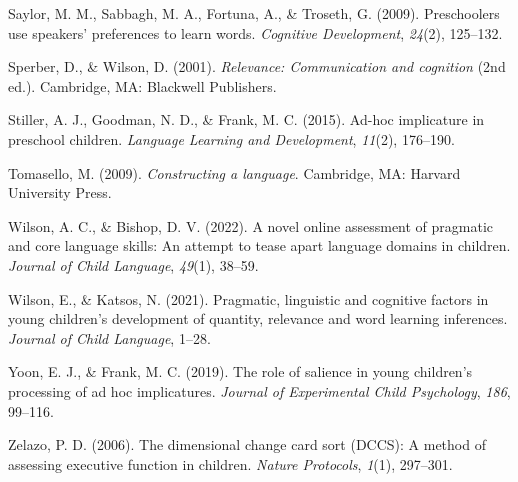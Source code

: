 \documentclass[
  man,floatsintext]{apa6}
\newlength{\cslhangindent}
\newlength{\cslentryspacingunit} %
\newenvironment{CSLReferences}[2] %
 {%
  \setlength{\parindent}{0pt}
  \ifodd #1
  \let\oldpar\par
  \def\par{\hangindent=\cslhangindent\oldpar}
  \fi
  \setlength{\parskip}{#2\cslentryspacingunit}
 }%
 {}
\begin{document}
\begin{CSLReferences}{1}{0}
\leavevmode{}%
Saylor, M. M., Sabbagh, M. A., Fortuna, A., \& Troseth, G. (2009). Preschoolers use speakers' preferences to learn words. \emph{Cognitive Development}, \emph{24}(2), 125--132.

\leavevmode{}%
Sperber, D., \& Wilson, D. (2001). \emph{Relevance: Communication and cognition} (2nd ed.). Cambridge, MA: Blackwell Publishers.

\leavevmode{}%
Stiller, A. J., Goodman, N. D., \& Frank, M. C. (2015). Ad-hoc implicature in preschool children. \emph{Language Learning and Development}, \emph{11}(2), 176--190.

\leavevmode{}%
Tomasello, M. (2009). \emph{Constructing a language}. Cambridge, MA: Harvard University Press.

\leavevmode{}%
Wilson, A. C., \& Bishop, D. V. (2022). A novel online assessment of pragmatic and core language skills: An attempt to tease apart language domains in children. \emph{Journal of Child Language}, \emph{49}(1), 38--59.

\leavevmode{}%
Wilson, E., \& Katsos, N. (2021). Pragmatic, linguistic and cognitive factors in young children's development of quantity, relevance and word learning inferences. \emph{Journal of Child Language}, 1--28.

\leavevmode{}%
Yoon, E. J., \& Frank, M. C. (2019). The role of salience in young children's processing of ad hoc implicatures. \emph{Journal of Experimental Child Psychology}, \emph{186}, 99--116.

\leavevmode{}%
Zelazo, P. D. (2006). The dimensional change card sort (DCCS): A method of assessing executive function in children. \emph{Nature Protocols}, \emph{1}(1), 297--301.

\end{CSLReferences}

\endgroup
\end{document}
